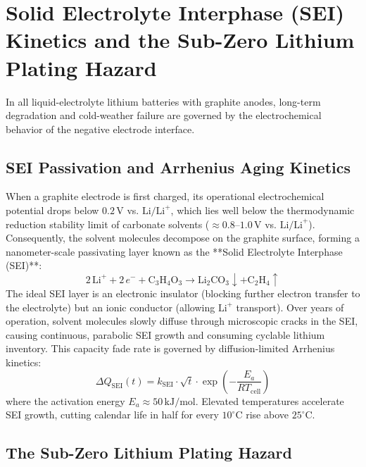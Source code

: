 \section{Solid Electrolyte Interphase (SEI) Kinetics and the Sub-Zero Lithium Plating Hazard}

In all liquid-electrolyte lithium batteries with graphite anodes, long-term degradation and cold-weather failure are governed by the electrochemical behavior of the negative electrode interface.

\subsection{SEI Passivation and Arrhenius Aging Kinetics}

When a graphite electrode is first charged, its operational electrochemical potential drops below $0.2\,\mathrm{V}$ vs. $\mathrm{Li/Li}^+$, which lies well below the thermodynamic reduction stability limit of carbonate solvents ($\approx 0.8$--$1.0\,\mathrm{V}$ vs. $\mathrm{Li/Li}^+$). Consequently, the solvent molecules decompose on the graphite surface, forming a nanometer-scale passivating layer known as the **Solid Electrolyte Interphase (SEI)**:
\begin{equation}
2\,\mathrm{Li}^+ + 2\,e^- + \mathrm{C}_3\mathrm{H}_4\mathrm{O}_3 \longrightarrow \mathrm{Li}_2\mathrm{CO}_3 \downarrow + \mathrm{C}_2\mathrm{H}_4 \uparrow
\label{eq:sei_formation}
\end{equation}
The ideal SEI layer is an electronic insulator (blocking further electron transfer to the electrolyte) but an ionic conductor (allowing $\mathrm{Li}^+$ transport). Over years of operation, solvent molecules slowly diffuse through microscopic cracks in the SEI, causing continuous, parabolic SEI growth and consuming cyclable lithium inventory. This capacity fade rate is governed by diffusion-limited Arrhenius kinetics:
\begin{equation}
\Delta Q_{\mathrm{SEI}}(t) = k_{\mathrm{SEI}} \cdot \sqrt{t} \cdot \exp\left( -\frac{E_a}{R T_{\mathrm{cell}}} \right)
\label{eq:sei_growth_kinetics}
\end{equation}
where the activation energy $E_a \approx 50\,\mathrm{kJ/mol}$. Elevated temperatures accelerate SEI growth, cutting calendar life in half for every $10^\circ\mathrm{C}$ rise above $25^\circ\mathrm{C}$.

\subsection{The Sub-Zero Lithium Plating Hazard}

